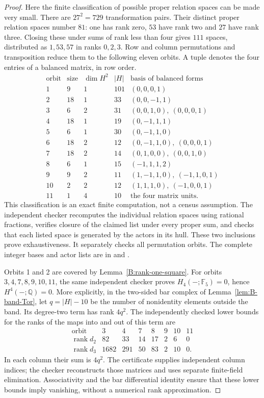 \begin{proof}
Here the finite classification of possible proper relation spaces
can be made very small.  There are $27^2=729$ transformation pairs.
Their distinct proper relation spaces number $81$: one has rank
zero, $53$ have rank two and $27$ have rank three.  Closing these
under sums of rank less than four gives $111$ spaces, distributed
as $1,53,57$ in ranks $0,2,3$.  Row and column permutations and
transposition reduce them to the following eleven orbits.
A tuple denotes the four entries of a balanced matrix, in row order.
\[
\begin{array}{c|r|r|r|l}
\text{orbit}&\text{size}&\dim H^2&|H|&\text{basis of balanced forms}\\\hline
1&9&1&101&(0,0,0,1)\\
2&18&1&33&(0,0,-1,1)\\
3&6&2&31&(0,0,1,0),\ (0,0,0,1)\\
4&18&1&19&(0,-1,1,1)\\
5&6&1&30&(0,-1,1,0)\\
6&18&2&12&(0,-1,1,0),\ (0,0,0,1)\\
7&18&2&14&(0,1,0,0),\ (0,0,1,0)\\
8&6&1&15&(-1,1,1,2)\\
9&9&2&11&(1,-1,1,0),\ (-1,1,0,1)\\
10&2&2&12&(1,1,1,0),\ (-1,0,0,1)\\
11&1&4&10&\text{the four matrix units}.
\end{array}
\]
This classification is an exact finite computation, not a census
assumption.  The independent checker
 recomputes the individual
relation spaces using rational fractions, verifies closure of the
claimed list under every proper sum, and checks that each listed
space is generated by the actors in its hull.  These two inclusions
prove exhaustiveness.  It separately checks all permutation orbits.
The complete integer bases and actor lists are in
 and
.

Orbits 1 and 2 are covered by Lemma~\ref{B:rank-one-square}.
For orbits $3,4,7,8,9,10,11$, the same independent checker proves
$H_4(-;\mathbb F_5)=0$, hence $H^4(-;\mathbb Q)=0$.
More explicitly, in the two-sided bar complex of
Lemma~\ref{lem:B-band-Tor}, let $q=|H|-10$ be the number of
nonidentity elements outside the band.  Its degree-two term has
rank $4q^2$.  The independently checked lower bounds for the ranks
of the maps into and out of this term are
\[
\begin{array}{c|rrrrrrr}
 \text{orbit}&3&4&7&8&9&10&11\\\hline
 \operatorname{rank}d_2&82&33&14&17&2&6&0\\
 \operatorname{rank}d_3&1682&291&50&83&2&10&0.
\end{array}
\]
In each column their sum is $4q^2$.  The certificate supplies
independent column indices; the checker reconstructs those matrices
and uses separate finite-field elimination.  Associativity and the
bar differential identity ensure that these lower bounds imply
vanishing, without a numerical rank approximation.


\end{proof}
